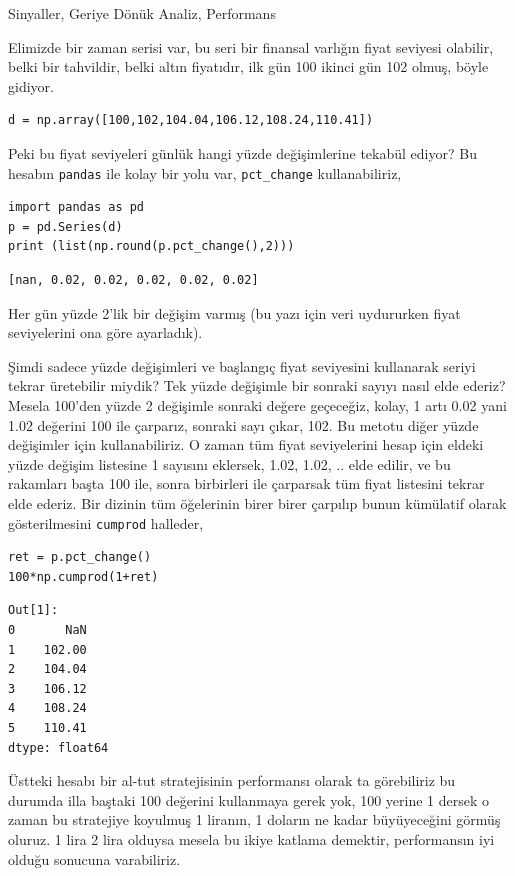\documentclass[12pt,fleqn]{article}\usepackage{../../common}
\begin{document}
Sinyaller, Geriye Dönük Analiz, Performans

Elimizde bir zaman serisi var, bu seri bir finansal varlığın fiyat seviyesi
olabilir, belki bir tahvildir, belki altın fiyatıdır, ilk gün 100 ikinci gün 102
olmuş, böyle gidiyor.

\begin{verbatim}
d = np.array([100,102,104.04,106.12,108.24,110.41])
\end{verbatim}

Peki bu fiyat seviyeleri günlük hangi yüzde değişimlerine tekabül ediyor?  Bu
hesabın \verb!pandas! ile kolay bir yolu var, \verb!pct_change! kullanabiliriz,

\begin{verbatim}
import pandas as pd
p = pd.Series(d)
print (list(np.round(p.pct_change(),2)))
\end{verbatim}

\begin{verbatim}
[nan, 0.02, 0.02, 0.02, 0.02, 0.02]
\end{verbatim}

Her gün yüzde 2'lik bir değişim varmış (bu yazı için veri uydururken fiyat
seviyelerini ona göre ayarladık).

Şimdi sadece yüzde değişimleri ve başlangıç fiyat seviyesini kullanarak seriyi
tekrar üretebilir miydik? Tek yüzde değişimle bir sonraki sayıyı nasıl elde
ederiz?  Mesela 100'den yüzde 2 değişimle sonraki değere geçeceğiz, kolay, 1
artı 0.02 yani 1.02 değerini 100 ile çarparız, sonraki sayı çıkar, 102. Bu
metotu diğer yüzde değişimler için kullanabiliriz. O zaman tüm fiyat
seviyelerini hesap için eldeki yüzde değişim listesine 1 sayısını eklersek,
1.02, 1.02, .. elde edilir, ve bu rakamları başta 100 ile, sonra birbirleri ile
çarparsak tüm fiyat listesini tekrar elde ederiz. Bir dizinin tüm öğelerinin
birer birer çarpılıp bunun kümülatif olarak gösterilmesini \verb!cumprod!
halleder,

\begin{verbatim}
ret = p.pct_change()
100*np.cumprod(1+ret)
\end{verbatim}

\begin{verbatim}
Out[1]: 
0       NaN
1    102.00
2    104.04
3    106.12
4    108.24
5    110.41
dtype: float64
\end{verbatim}

Üstteki hesabı bir al-tut stratejisinin performansı olarak ta görebiliriz bu
durumda illa baştaki 100 değerini kullanmaya gerek yok, 100 yerine 1 dersek o
zaman bu stratejiye koyulmuş 1 liranın, 1 doların ne kadar büyüyeceğini görmüş
oluruz.  1 lira 2 lira olduysa mesela bu ikiye katlama demektir, performansın
iyi olduğu sonucuna varabiliriz.
\end{document}
